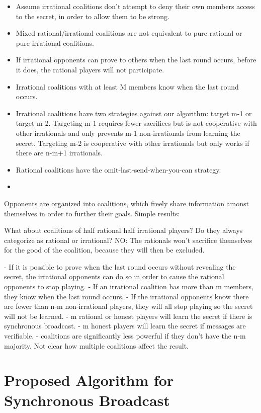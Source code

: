 \documentclass{article}
\begin{document}
\begin{itemize}
  \item Assume irrational coalitions don't attempt to deny their own members access to the secret, in order to allow them to be strong. 
  \item Mixed rational/irrational coalitions are not equivalent to pure rational or pure irrational coalitions.
  \item If irrational opponents can prove to others when the last round occurs, before it does, the rational players will not participate.
  \item Irrational coalitions with at least M members know when the last round occurs.
  \item Irrational coalitions have two strategies against our algorithm: target m-1 or target m-2. Targeting m-1 requires fewer sacrifices but is not cooperative with other irrationals and only prevents m-1 non-irrationals from learning the secret. Targeting m-2 is cooperative with other irrationals but only works if there are n-m+1 irrationals.
  \item Rational coalitions have the omit-last-send-when-you-can strategy.
  \item 
\end{itemize}
Opponents are organized into coalitions, which freely share information amonst themselves in order to further their goals. Simple results:

What about coalitions of half rational half irrational players? Do they always categorize as rational or irrational? NO: The rationals won't sacrifice themselves for the good of the coalition, because they will then be excluded.

- If it is possible to prove when the last round occurs without revealing the secret, the irrational opponents can do so in order to cause the rational opponents to stop playing.
- If an irrational coalition has more than m members, they know when the last round occurs.
- If the irrational opponents know there are fewer than n-m non-irrational players, they will all stop playing so the secret will not be learned.
- m rational or honest players will learn the secret if there is synchronous broadcast.
- m honest players will learn the secret if messages are verifiable.
- coalitions are significantly less powerful if they don't have the n-m majority. Not clear how multiple coalitions affect the result.

\section{Proposed Algorithm for Synchronous Broadcast}
\end{document}
